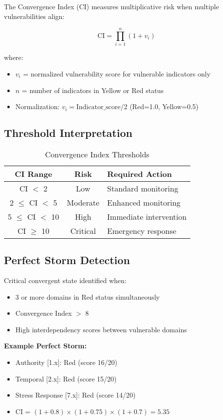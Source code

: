 \documentclass[11pt,a4paper]{article}
\begin{document}
The Convergence Index (CI) measures multiplicative risk when multiple vulnerabilities align:

\begin{equation}
\text{CI} = \prod_{i=1}^{n} (1 + v_i)
\end{equation}

where:
\begin{itemize}
\item $v_i$ = normalized vulnerability score for vulnerable indicators only
\item $n$ = number of indicators in Yellow or Red status
\item Normalization: $v_i = \text{Indicator\_score} / 2$ (Red=1.0, Yellow=0.5)
\end{itemize}

\subsection{Threshold Interpretation}

\begin{table}[h]
\centering
\caption{Convergence Index Thresholds}
\begin{tabular}{ccp{5cm}}
\toprule
\textbf{CI Range} & \textbf{Risk} & \textbf{Required Action} \\
\midrule
CI $<$ 2 & Low & Standard monitoring \\
2 $\leq$ CI $<$ 5 & Moderate & Enhanced monitoring \\
5 $\leq$ CI $<$ 10 & High & Immediate intervention \\
CI $\geq$ 10 & Critical & Emergency response \\
\bottomrule
\end{tabular}
\end{table}

\subsection{Perfect Storm Detection}

Critical convergent state identified when:
\begin{itemize}
\item 3 or more domains in Red status simultaneously
\item Convergence Index $>$ 8
\item High interdependency scores between vulnerable domains
\end{itemize}

\textbf{Example Perfect Storm:}
\begin{itemize}
\item Authority {[}1.x{]}: Red (score 16/20)
\item Temporal {[}2.x{]}: Red (score 15/20)
\item Stress Response {[}7.x{]}: Red (score 14/20)
\item CI = $(1 + 0.8) \times (1 + 0.75) \times (1 + 0.7) = 5.35$
\end{itemize}
\end{document}
